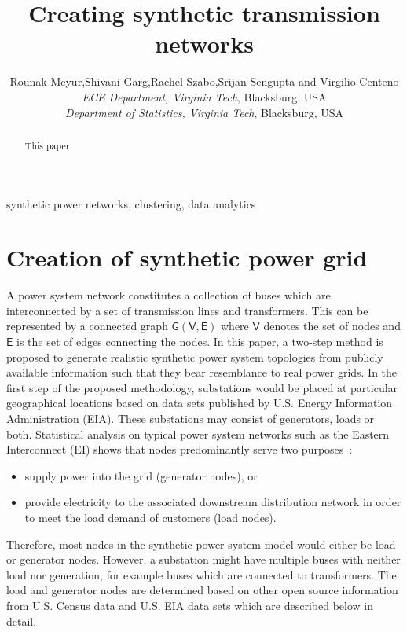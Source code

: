 \documentclass[10pt,conference]{IEEEtran}
\begin{document}
	\title{Creating synthetic transmission networks}
	
	\author
	{
		\IEEEauthorblockN
		{
			Rounak Meyur,Shivani Garg,Rachel Szabo,Srijan Sengupta and Virgilio Centeno
		}
		\IEEEauthorblockA
		{
			\textit{ECE Department, Virginia Tech}, Blacksburg, USA\\
			\textit{Department of Statistics, Virginia Tech}, Blacksburg, USA
		}
	}
	\maketitle
	
	\begin{abstract}
		This paper
	\end{abstract}

	\begin{IEEEkeywords}
		synthetic power networks, clustering, data analytics
	\end{IEEEkeywords}
	
	\section{Creation of synthetic power grid}\label{sec:synthetic}
	A power system network constitutes a collection of buses which are interconnected by a set of transmission lines and transformers. This can be represented by a connected graph $\mathsf{G}(\mathsf{V},\mathsf{E})$ where $\mathsf{V}$ denotes the set of nodes and $\mathsf{E}$ is the set of edges connecting the nodes. In this paper, a two-step method is proposed to generate realistic synthetic power system topologies from publicly available information such that they bear resemblance to real power grids. In the first step of the proposed methodology, substations would be placed at particular geographical locations based on data sets published by U.S. Energy Information Administration (EIA). These substations may consist of generators, loads or both. Statistical analysis on typical power system networks such as the Eastern Interconnect (EI) shows that nodes predominantly serve two purposes~\cite{overbye_102}: 
	\begin{itemize}
		\item supply power into the grid (generator nodes), or 
		\item provide electricity to the associated downstream distribution network in order to meet the load demand of customers (load nodes).
	\end{itemize}
	Therefore, most nodes in the synthetic power system model would either be load or generator nodes. However, a substation might have multiple buses with neither load nor generation, for example buses which are connected to transformers. The load and generator nodes are determined based on other open source information from U.S. Census data and U.S. EIA data sets which are described below in detail.
	
\end{document}
